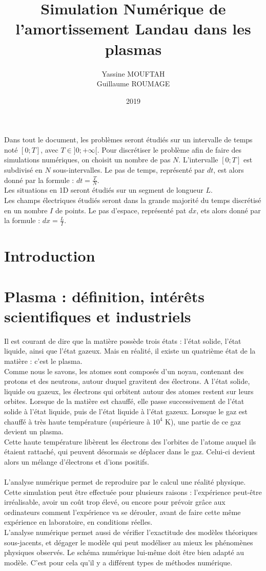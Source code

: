 \documentclass{article}
\title{Simulation Numérique de l'amortissement Landau dans les plasmas}
\date{2019}
\author{Yassine MOUFTAH\\Guillaume ROUMAGE}
\begin{document}
\maketitle
\newpage
\tableofcontents
\newpage
\noindent Dans tout le document, les problèmes seront étudiés sur un intervalle de temps noté $[0;T]$, avec $T \in ]0; + \infty[$. Pour discrétiser le problème afin de faire des simulations numériques, on choisit un nombre de pas $N$. L'intervalle $[0;T]$ est subdivisé en $N$ sous-intervalles. Le pas de temps, représenté par $dt$, est alors donné par la formule : $dt = \frac{T}{N}$.\\
Les situations en 1D seront étudiés sur un segment de longueur $L$.\\
Les champs électriques étudiés seront dans la grande majorité du temps discrétisé en un nombre $I$ de points. Le pas d'espace, représenté pat $dx$, ets alors donné par la formule : $dx = \frac{L}{I}$.
\newpage
\section{Introduction}
\section{Plasma : définition, intérêts scientifiques et industriels}
Il est courant de dire que la matière possède trois états : l'état solide, l'état liquide, ainsi que l'état gazeux. Mais en réalité, il existe un quatrième état de la matière : c'est le plasma.\\
Comme nous le savons, les atomes sont composés d'un noyau, contenant des protons et des neutrons, autour duquel gravitent des électrons. A l'état solide, liquide ou gazeux, les électrons qui orbitent autour des atomes restent sur leurs orbites. Lorsque de la matière est chauffé, elle passe successivement de l'état solide à l'état liquide, puis de l'état liquide à l'état gazeux. Lorsque le gaz est chauffé à très haute température (supérieure à $10^4$ K), une partie de ce gaz devient un plasma.\\
Cette haute température libèrent les électrons des l'orbites de l'atome auquel ils étaient rattaché, qui peuvent désormais se déplacer dans le gaz. Celui-ci devient alors un mélange d'électrons et d'ions positifs.\\
\\
L'analyse numérique permet de reproduire par le calcul une réalité physique. Cette simulation peut être effectuée pour plusieurs raisons : l'expérience peut-être irréalisable, avoir un coût trop élevé, ou encore pour prévoir grâce aux ordinateurs comment l'expérience va se dérouler, avant de faire cette même expérience en laboratoire, en conditions réelles.\\
L'analyse numérique permet aussi de vérifier l'exactitude des modèles théoriques sous-jacents, et dégager le modèle qui peut modéliser au mieux les phénomènes physiques observés. Le schéma numérique lui-même doit être bien adapté au modèle. C'est pour cela qu'il y a différent types de méthodes numérique.
\end{document}
